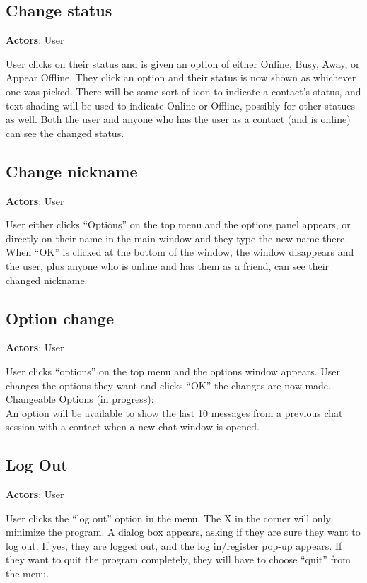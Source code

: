 \subsection*{Change status}

{\bf Actors}: User

User clicks on their status and is given an option of either Online, Busy, Away, or Appear Offline. They click an option and their status is now shown as whichever one was picked. There will be some sort of icon to indicate a contact’s status, and text shading will be used to indicate Online or Offline, possibly for other statues as well. Both the user and anyone who has the user as a contact (and is online) can see the changed status.

\subsection*{Change nickname}

{\bf Actors}: User

User either clicks ``Options'' on the top menu and the options panel appears, or directly on their name in the main window and they type the new name there. When ``OK'' is clicked at the bottom of the window, the window disappears and the user, plus anyone who is online and has them as a friend, can see their changed nickname.

\subsection*{Option change}

{\bf Actors}: User

User clicks ``options'' on the top menu and the options window appears. User changes the options they want and clicks ``OK'' the changes are now made. \\
Changeable Options (in progress):\\
An option will be available to show the last 10 messages from a previous chat session with a contact when a new chat window is opened.

\subsection*{Log Out}

{\bf Actors}: User

User clicks the ``log out'' option in the menu. The X in the corner will only minimize the program. A dialog box appears, asking if they are sure they want to log out. If yes, they are logged out, and the log in/register pop-up appears. If they want to quit the program completely, they will have to choose ``quit'' from the menu.


